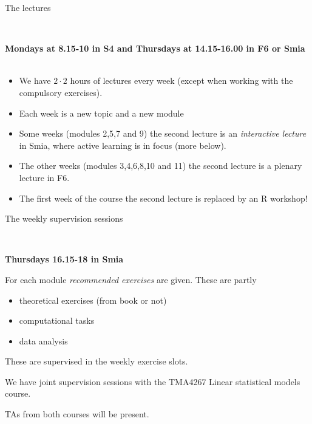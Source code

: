 \documentclass[10pt,ignorenonframetext,]{beamer}
\providecommand{\tightlist}{%
  \setlength{\itemsep}{0pt}\setlength{\parskip}{0pt}}
\begin{document}
\begin{frame}

\begin{block}{The lectures}

~

\textbf{Mondays at 8.15-10 in S4 and Thursdays at 14.15-16.00 in F6 or
Smia} ~

\begin{itemize}
\tightlist
\item
  We have \(2\cdot 2\) hours of lectures every week (except when working
  with the compulsory exercises).
\item
  Each week is a new topic and a new module
\item
  Some weeks (modules 2,5,7 and 9) the second lecture is an
  \emph{interactive lecture} in Smia, where active learning is in focus
  (more below).
\item
  The other weeks (modules 3,4,6,8,10 and 11) the second lecture is a
  plenary lecture in F6.
\item
  The first week of the course the second lecture is replaced by an R
  workshop!
\end{itemize}

\end{block}

\end{frame}

\begin{frame}

\begin{block}{The weekly supervision sessions}

~

\textbf{Thursdays 16.15-18 in Smia} ~\\
\hspace*{0.333em}

For each module \emph{recommended exercises} are given. These are partly

\begin{itemize}
\tightlist
\item
  theoretical exercises (from book or not)
\item
  computational tasks
\item
  data analysis
\end{itemize}

These are supervised in the weekly exercise slots.

We have joint supervision sessions with the TMA4267 Linear statistical
models course.

TAs from both courses will be present.

\end{block}

\end{frame}
\end{document}
